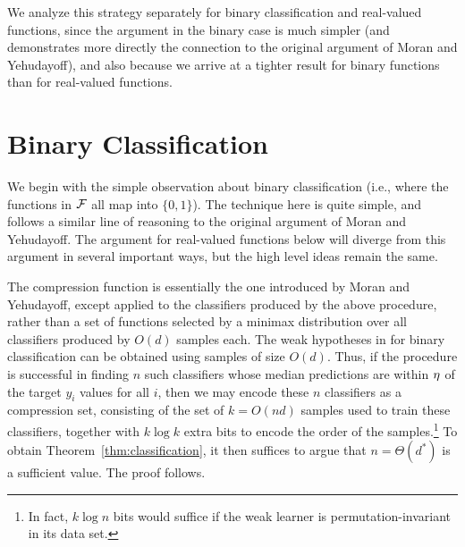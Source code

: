 We analyze this strategy separately for binary classification and real-valued functions, 
since the argument in the binary case is much simpler (and
demonstrates more directly
the connection to the 
original argument of Moran and Yehudayoff), and also because we arrive at a tighter result for binary functions 
than for real-valued functions.

    
    


\section{Binary Classification}

\label{subsubsec:binary-classification-compression}

We begin with the simple observation about binary classification (i.e., where the functions in $\mathcal{F}$ all map into $\{0,1\}$).
The technique here is quite simple, and follows a similar line of reasoning to the 
original argument of Moran and Yehudayoff.  The argument for real-valued functions 
below will diverge from this argument in several important ways, but the high level 
ideas remain the same.

The compression function is essentially the one introduced by Moran and Yehudayoff, 
except applied to the classifiers produced by the above  procedure, 
rather than a set of functions selected by a minimax distribution over all classifiers produced by $O(d)$ samples each.
The weak hypotheses in  for binary classification can be obtained using samples of size $O(d)$.
Thus, if the  procedure is successful in finding $n$ such classifiers whose median predictions are 
within $\eta$ of the target $y_{i}$ values for all $i$, 
then we may encode these $n$ classifiers as a compression set, 
consisting of the set of $k = O(nd)$ samples used to train these classifiers, 
together with $k \log k$ extra bits to encode the order of the samples.\footnote{In fact, 
$k \log n$ bits would suffice if the weak learner is permutation-invariant in its data set.}
To obtain Theorem~\ref{thm:classification}, it then suffices to argue that $n=\Theta(d^{*})$ is a sufficient value.
The proof follows.

